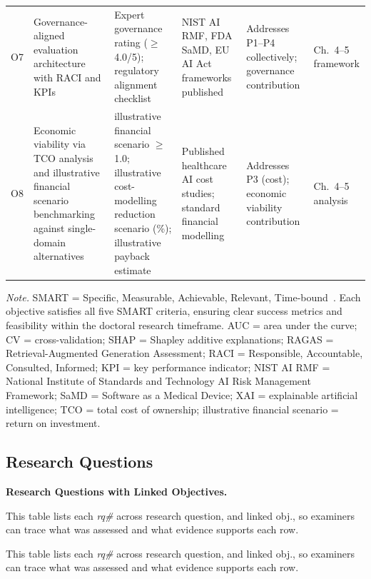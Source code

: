 {\begin{xltabular}{\textwidth}{@{} >{\raggedright\arraybackslash}p{1.0cm} p{2.9cm} p{2.9cm} p{2.8cm} p{2.6cm} >{\raggedright\arraybackslash}p{2.0cm} @{}}
\addlinespace
O7 & Governance-aligned evaluation architecture with RACI and KPIs & Expert governance rating ($\geq$4.0/5); regulatory alignment checklist & NIST AI RMF, FDA SaMD, EU AI Act frameworks published & Addresses P1--P4 collectively; governance contribution & Ch.~4--5 framework \\
\addlinespace
O8 & Economic viability via TCO analysis and illustrative financial scenario benchmarking against single-domain alternatives & illustrative financial scenario $\geq$1.0; illustrative cost-modelling reduction scenario (\%); illustrative payback estimate & Published healthcare AI cost studies; standard financial modelling & Addresses P3 (cost); economic viability contribution & Ch.~4--5 analysis \\
\end{xltabular}}
\vspace{0.5em}
\noindent\textit{Note.} SMART = Specific, Measurable, Achievable, Relevant, Time-bound~\cite{doran1981smart}. Each objective satisfies all five SMART criteria, ensuring clear success metrics and feasibility within the doctoral research timeframe. AUC = area under the curve; CV = cross-validation; SHAP = Shapley additive explanations; RAGAS = Retrieval-Augmented Generation Assessment; RACI = Responsible, Accountable, Consulted, Informed; KPI = key performance indicator; NIST AI RMF = National Institute of Standards and Technology AI Risk Management Framework; SaMD = Software as a Medical Device; XAI = explainable artificial intelligence; TCO = total cost of ownership; illustrative financial scenario = return on investment.
\fi %

\label{tab:smart_objectives}

\subsection{Research Questions}

\noindent\textbf{Research Questions with Linked Objectives.}



\noindent This table lists each \textit{rq\#} across research question, and linked obj., so examiners can trace what was assessed and what evidence supports each row.



\noindent This table lists each \textit{rq\#} across research question, and linked obj., so examiners can trace what was assessed and what evidence supports each row.


